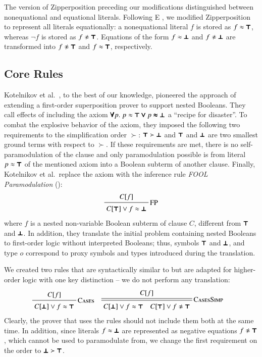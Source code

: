 The version of Zipperposition preceding our modifications distinguished between non\-equational
and equational literals. Following E \cite{scv-19-e23}, we
modified Zipperposition to represent all literals equationally: a nonequational
literal $f$ is stored as $f \approx \pmb\top$, whereas $\neg f$ is stored as $f
\noteq \itrue$. Equations of the form $f \approx \pmb\bot $ and $f \noteq \ifalse$ are
transformed into $f \noteq \itrue$ and $f \approx \pmb\top$, respectively.

\subsection{Core Rules}
\label{subsect:bool:core}

Kotelnikov et al.\ \cite{kotelnikov-15-fool}, to the best of our
knowledge, pioneered the approach of extending a first-order superposition prover to support
nested Booleans. They call effects of including the axiom $\pmb\forall
p. \; p \approx \pmb\top \pmb\lor p \pmb\approx \pmb\bot$ a  ``recipe for disaster''. To combat the
explosive behavior of the axiom, they imposed the following two requirements to
the simplification order $\succ$: $\pmb\top \succ \pmb\bot$ and
$\pmb\top$ and $\pmb\bot$ are two smallest ground terms with respect to $\succ$. If
these requirements are met, there is no self-paramodulation of the clause
and only paramodulation possible is from literal $p \approx \pmb\top$ of the mentioned axiom
into a Boolean subterm of another clause. Finally, Kotelnikov et al.\ replace
the axiom with the inference rule \emph{FOOL Paramodulation} ():
%
$$ \namedinference{FP}{C[f]}{C[\itrue] \vee f \eq \ifalse} $$
%
where $f$ is a nested non-variable Boolean subterm of clause $C$, different from
$\pmb\top$ and $\pmb\bot$. In addition, they translate the initial problem containing nested
Booleans  to first-order logic without interpreted Booleans; thus, symbols $\pmb\top$ and $\pmb\bot$, and type $o$
correspond to proxy symbols and types introduced during the translation. 

We created two rules that are syntactically similar to  but
are adapted for higher-order logic with one key distinction -- we do not perform any translation:
%
\begin{align*}
  & \namedinference{Cases}{C[f]}{C[\ifalse] \vee f \eq \itrue}
  && \namedsimp{CasesSimp}{C[f]}{C[\ifalse] \vee f \eq \itrue \quad C[\itrue] \vee f \noteq \itrue}
\end{align*}
%
Clearly, the prover that uses the rules should not include them both at the same time.
In addition, since
literals $f \approx \pmb\bot$ are represented as negative equations $f \noteq \itrue$, which cannot be used to paramodulate from,
we change the first requirement on the order to $\pmb\bot \succ
\pmb\top$.


